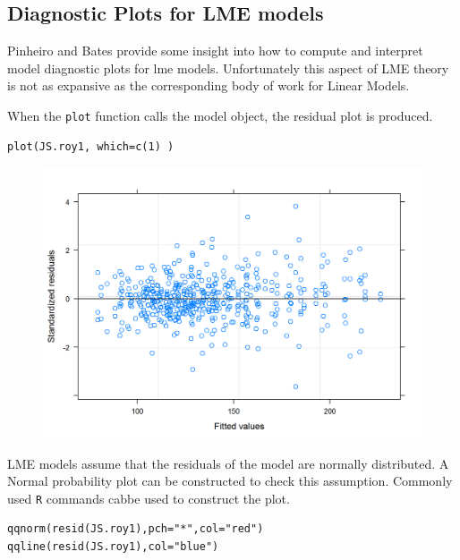 \documentclass[a4paper,12pt]{article}
\begin{document}
 	\tableofcontents
\newpage


\subsection{Diagnostic Plots for LME models}

Pinheiro and Bates provide some insight into how to compute and interpret model diagnostic plots for lme models. Unfortunately this aspect of LME theory is not as expansive as the corresponding body of work for Linear Models.

When the \texttt{plot} function calls the model object, the residual plot is produced.





\begin{framed}
\begin{verbatim}
plot(JS.roy1, which=c(1) )
\end{verbatim}
\end{framed}


\begin{figure}[h!]
	\centering
	\includegraphics[width=0.9\linewidth]{images/ResidPlot1}
	\caption{}
	\label{fig:ResidPlot1}
\end{figure}
LME models assume that the residuals of the model are normally distributed. A Normal probability plot can be constructed to check this assumption. Commonly used \texttt{R} commands cabbe used to construct the plot.
\newpage

\begin{framed}
	\begin{verbatim}
qqnorm(resid(JS.roy1),pch="*",col="red")
qqline(resid(JS.roy1),col="blue")
	\end{verbatim}
\end{framed}
\end{document}
